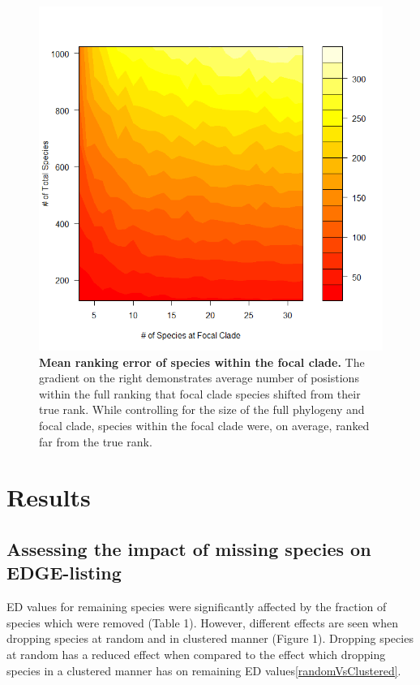 \documentclass[12pt,english]{article}
\begin{document}
\begin{figure}[!ht]
  \center
  \includegraphics[width=\textwidth]{rankingError.png}
  \caption{\textbf{Mean ranking error of species within the focal clade.} The 
  gradient on the right demonstrates average number of posistions within the 
  full ranking that focal clade species shifted from their true rank.
  While controlling for the size of the full phylogeny and focal clade, species 
  within the focal clade were, on average, ranked far from the true rank. }
  \label{rankingError}
\end{figure}

\section*{Results}
\subsection*{Assessing the impact of missing species on EDGE-listing}

ED values for remaining species were significantly affected by the
fraction of species which were removed (Table 1). However, different
effects are seen when dropping species at random and in clustered
manner (Figure 1). Dropping species at random has a reduced effect
when compared to the effect which dropping species in a clustered
manner has on remaining ED values\ref{randomVsClustered}.
\end{document}
